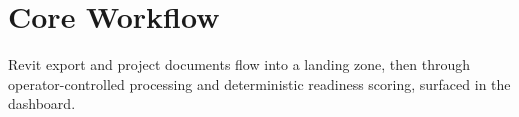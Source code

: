 \section{Core Workflow}
Revit export and project documents flow into a landing zone, then through operator-controlled processing and deterministic readiness scoring, surfaced in the dashboard.


